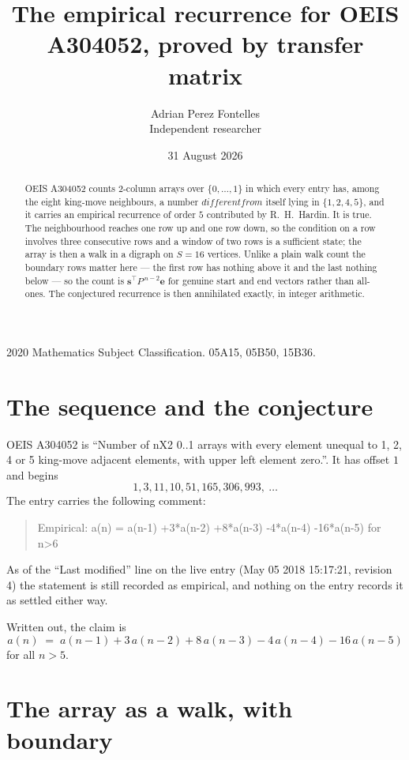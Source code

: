 \documentclass[11pt,a4paper]{article}
\title{The empirical recurrence for OEIS A304052, proved by transfer matrix}
\author{Adrian Perez Fontelles\\ \small Independent researcher}
\date{31 August 2026}
\theoremstyle{plain}
\theoremstyle{definition}
\begin{document}
\maketitle

\begin{abstract}
OEIS A304052 counts $2$-column arrays over $\{0,\dots,1\}$ in which every entry has,
among the eight king-move neighbours, a number $different from$ itself lying in $\{1,2,4,5\}$, and it carries an empirical
recurrence of order $5$ contributed by R.~H.~Hardin. It is true. The neighbourhood
reaches one row up and one row down, so the condition on a row involves three consecutive
rows and a window of two rows is a sufficient state; the array is then a walk in a digraph
on $S=16$ vertices. Unlike a plain walk count the boundary rows matter here --- the first
row has nothing above it and the last nothing below --- so the count is
$\mathbf{s}^{\!\top}P^{\,n-2}\mathbf{e}$ for genuine start and end vectors rather than
all-ones. The conjectured recurrence is then annihilated exactly, in integer arithmetic.
\end{abstract}

\noindent\small 2020 Mathematics Subject Classification. 05A15, 05B50, 15B36.\normalsize

\section{The sequence and the conjecture}

OEIS A304052 is ``Number of nX2 0..1 arrays with every element unequal to 1, 2, 4 or 5 king-move adjacent elements, with upper left element zero.''. It has offset
$1$ and begins
\[
1, 3, 11, 10, 51, 165, 306, 993,\ \dots
\]
The entry carries the following comment:
\begin{quote}\small
Empirical: a(n) = a(n-1) +3*a(n-2) +8*a(n-3) -4*a(n-4) -16*a(n-5) for n>6
\end{quote}
As of the ``Last modified'' line on the live entry (May 05 2018 15:17:21, revision
4) the statement is still recorded as empirical, and nothing on the entry
records it as settled either way.

Written out, the claim is
\begin{equation}\label{eq:conj}
a(n)\;=\;a(n-1) + 3\,a(n-2) + 8\,a(n-3) - 4\,a(n-4) - 16\,a(n-5)
\end{equation}
for all $n>5$.

\section{The array as a walk, with boundary}
\end{document}
